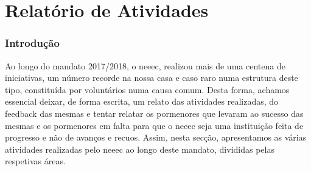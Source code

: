 
\part{Relatório de Atividades}

\section{Introdução}

Ao longo do mandato 2017/2018, o \acrshort{neeec}, realizou mais de uma centena de iniciativas, um número recorde na nossa casa e caso raro numa estrutura deste tipo, constituída por voluntários numa causa comum. Desta forma, achamos essencial deixar, de forma escrita, um relato das atividades realizadas, do feedback das mesmas e tentar relatar os pormenores que levaram ao sucesso das mesmas e os pormenores em falta para que o \acrshort{neeec} seja uma instituição feita de progresso e não de avanços e recuos. Assim, nesta secção, apresentamos as várias atividades realizadas pelo \acrshort{neeec} ao longo deste mandato, divididas pelas respetivas áreas.

\clearpage


\clearpage


\clearpage


\clearpage


\clearpage


\clearpage


\clearpage


\clearpage


\clearpage


\clearpage


\clearpage


\clearpage


\clearpage


\clearpage


\clearpage


{ %
\clearpage

}
{ %
}

\clearpage


\clearpage
